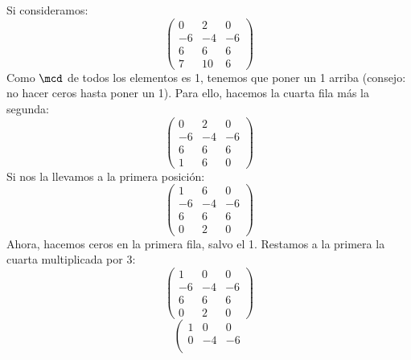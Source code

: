 \begin{ejemplo} %
    Si consideramos:
    \begin{equation*}
        \left(\begin{array}{ccc}
            0 & 2 & 0 \\
            -6 & -4 & -6 \\
            6 & 6 & 6 \\
            7 & 10 & 6 
        \end{array}\right)
    \end{equation*}
    Como $\mcd$ de todos los elementos es 1, tenemos que poner un 1 arriba (consejo: no hacer ceros hasta poner un 1). Para ello, hacemos la cuarta fila más la segunda:
    \begin{equation*}
        \left(\begin{array}{ccc}
            0 & 2 & 0 \\
            -6 & -4 & -6 \\
            6 & 6 & 6 \\
            1 & 6 & 0 
        \end{array}\right)
    \end{equation*}
    Si nos la llevamos a la primera posición:
    \begin{equation*}
        \left(\begin{array}{ccc}
            1 & 6 & 0 \\
            -6 & -4 & -6 \\
            6 & 6 & 6 \\
            0 & 2 & 0 
        \end{array}\right)
    \end{equation*}
    Ahora, hacemos ceros en la primera fila, salvo el 1. Restamos a la primera la cuarta multiplicada por 3:
    \begin{equation*}
        \left(\begin{array}{ccc}
            1 & 0 & 0 \\
            -6 & -4 & -6 \\
            6 & 6 & 6  \\
            0 & 2 & 0 
        \end{array}\right)
    \end{equation*}
    \begin{equation*}
        \left(\begin{array}{ccc}
            1 & 0 & 0 \\
            0 & -4 & -6 \\

\end{array}
\end{equation*}
\end{ejemplo}
